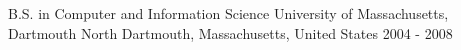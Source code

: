 
\begin{cventries}

  \cventry
    {B.S. in Computer and Information Science} %
    {University of Massachusetts, Dartmouth} %
    {North Dartmouth, Massachusetts, United States} %
    {2004 - 2008} %
    {}

\end{cventries}
